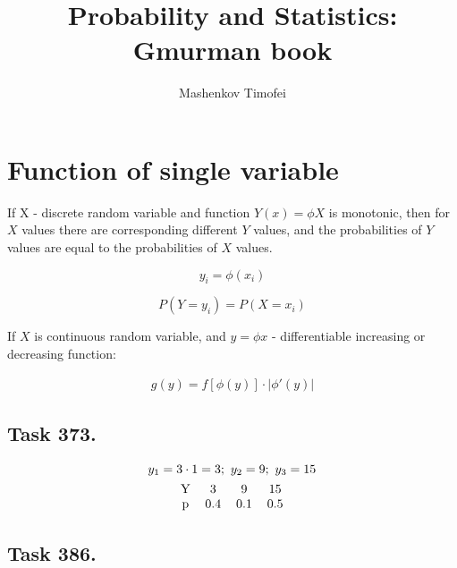 \documentclass{article}
\title{Probability and Statistics: Gmurman book}
\author{Mashenkov Timofei}
\begin{document}
\maketitle{}

\section*{Function of single variable}

If X - discrete random variable and function $Y(x) = \phi{X}$ is monotonic, then for $X$ values there are corresponding different $Y$ values, and the probabilities of $Y$ values are equal to the probabilities of $X$ values.

\begin{equation*}
  y_i = \phi(x_i)
\end{equation*}

\begin{equation*}
  P(Y = y_i) = P(X = x_i)
\end{equation*}

If $X$ is continuous random variable, and $y=\phi{x}$ - differentiable increasing or decreasing function:

\begin{eqnarray*}
  g(y) = f [\phi(y)] \cdot |\phi'(y)|
\end{eqnarray*}

\subsection*{Task 373.}

\begin{fleqn}[1\parindent]
  \begin{gather*}
    y_1 = 3\cdot 1 = 3;\ y_2 = 9;\ y_3 = 15 \\ 
    \begin{tabular}{c c c c}
      Y & 3 & 9 & 15 \\ 
      p & 0.4 & 0.1 & 0.5
    \end{tabular}
  \end{gather*}
\end{fleqn}

\subsection*{Task 386.}
\end{document}
